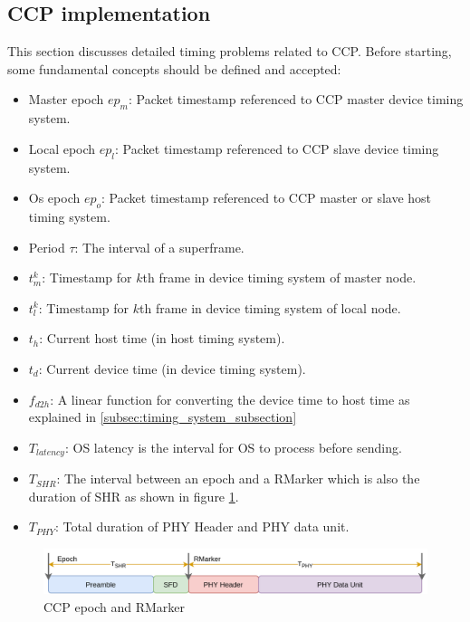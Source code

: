 \documentclass[\main/main.tex]{subfiles}
\begin{document}
\subsection{CCP implementation}
This section discusses detailed timing problems related to CCP. Before starting, some fundamental concepts should be defined and accepted:
\begin{itemize}
    \item Master epoch $ep_m$: Packet timestamp referenced to CCP master device timing system.
    \item Local epoch $ep_l$: Packet timestamp referenced to CCP slave device timing system.
    \item Os epoch $ep_o$: Packet timestamp referenced to CCP master or slave host timing system.
    \item Period $\tau$: The interval of a superframe.
    \item $t^k_{m}$: Timestamp for $k$th frame in device timing system of master node.
    \item $t^k_{l}$: Timestamp for $k$th frame in device timing system of local node.
    \item $t_h$: Current host time (in host timing system).
    \item $t_d$: Current device time (in device timing system).
    \item $f_{d2h}$: A linear function for converting the device time to host time as explained in \ref{subsec:timing_system_subsection}
    \item $T_{latency}$: OS latency is the interval for OS to process before sending.
    \item $T_{SHR}$: The interval between an epoch and a RMarker which is also the duration of SHR as shown in figure \ref{fig:ccp_epoch_and_rmarker}.
    \item $T_{PHY}$: Total duration of PHY Header and PHY data unit.
\end{itemize}
\begin{figure}[H]
    \begin{center}
        \includegraphics[scale=0.35]{ccp_epoch_and_rmarker.png}
    \end{center}
    \caption{CCP epoch and RMarker}
    \label{fig:ccp_epoch_and_rmarker}
\end{figure}
\end{document}
